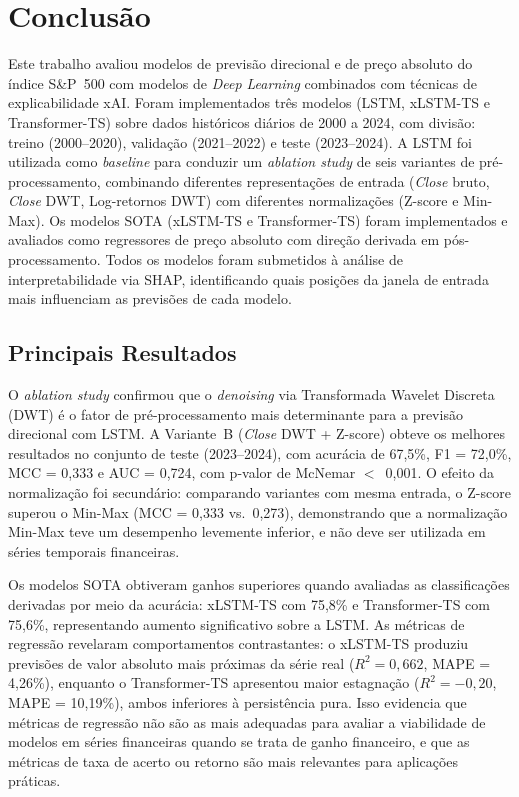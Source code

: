 \chapter[Conclusão]{Conclusão}
\label{ch:conclusao}

Este trabalho avaliou modelos de previsão direcional e de preço absoluto do índice S\&P~500 com modelos de \textit{Deep Learning} combinados com técnicas de explicabilidade xAI. Foram implementados três modelos (LSTM, xLSTM-TS e Transformer-TS) sobre dados históricos diários de 2000 a 2024, com divisão: treino (2000--2020), validação (2021--2022) e teste (2023--2024). A LSTM foi utilizada como \textit{baseline} para conduzir um \textit{ablation study} de seis variantes de pré-processamento, combinando diferentes representações de entrada (\textit{Close} bruto, \textit{Close} DWT, Log-retornos DWT) com diferentes normalizações (Z-score e Min-Max). Os modelos SOTA (xLSTM-TS e Transformer-TS) foram implementados e avaliados como regressores de preço absoluto com direção derivada em pós-processamento. Todos os modelos foram submetidos à análise de interpretabilidade via SHAP, identificando quais posições da janela de entrada mais influenciam as previsões de cada modelo.

\section{Principais Resultados}

O \textit{ablation study} confirmou que o \textit{denoising} via Transformada Wavelet Discreta (DWT) é o fator de pré-processamento mais determinante para a previsão direcional com LSTM. A Variante~B (\textit{Close} DWT + Z-score) obteve os melhores resultados no conjunto de teste (2023--2024), com acurácia de 67,5\%, F1 = 72,0\%, MCC = 0,333 e AUC = 0,724, com p-valor de McNemar $<$~0,001. O efeito da normalização foi secundário: comparando variantes com mesma entrada, o Z-score superou o Min-Max (MCC = 0,333 vs.\ 0,273), demonstrando que a normalização Min-Max teve um desempenho levemente inferior, e não deve ser utilizada em séries temporais financeiras.

Os modelos SOTA obtiveram ganhos superiores quando avaliadas as classificações derivadas por meio da acurácia: xLSTM-TS com 75,8\% e Transformer-TS com 75,6\%, representando aumento significativo sobre a LSTM. As métricas de regressão revelaram comportamentos contrastantes: o xLSTM-TS produziu previsões de valor absoluto mais próximas da série real ($R^2 = 0{,}662$, MAPE = 4,26\%), enquanto o Transformer-TS apresentou maior estagnação ($R^2 = -0{,}20$, MAPE = 10,19\%), ambos inferiores à persistência pura. Isso evidencia que métricas de regressão não são as mais adequadas para avaliar a viabilidade de modelos em séries financeiras quando se trata de ganho financeiro, e que as métricas de taxa de acerto ou retorno são mais relevantes para aplicações práticas.


